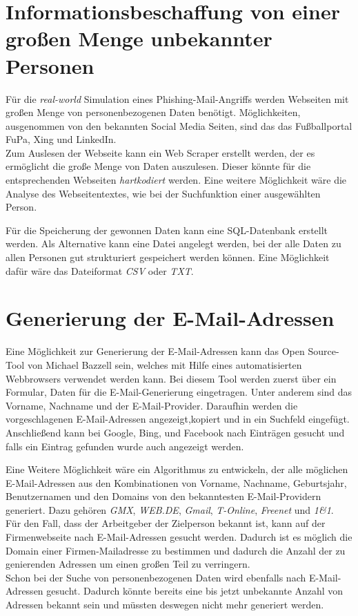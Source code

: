 \section{Informationsbeschaffung von einer großen Menge unbekannter Personen}
Für die \textit{real-world} Simulation eines Phishing-Mail-Angriffs werden Webseiten mit großen Menge von personenbezogenen Daten benötigt. Möglichkeiten, ausgenommen von den bekannten Social Media Seiten, sind das das Fußballportal FuPa, Xing und LinkedIn.\\
Zum Auslesen der Webseite kann ein Web Scraper erstellt werden, der es ermöglicht die große Menge von Daten auszulesen. Dieser könnte für die entsprechenden Webseiten \textit{hartkodiert} werden. Eine weitere Möglichkeit wäre die Analyse des Webseitentextes, wie bei der Suchfunktion einer ausgewählten Person.

Für die Speicherung der gewonnen Daten kann eine SQL-Datenbank erstellt werden.
Als Alternative kann eine Datei angelegt werden, bei der alle Daten zu allen Personen gut strukturiert gespeichert werden können. Eine Möglichkeit dafür wäre das Dateiformat \textit{CSV} oder \textit{TXT}.

\section{Generierung der E-Mail-Adressen}
Eine Möglichkeit zur Generierung der E-Mail-Adressen kann das Open Source-Tool von Michael Bazzell \cite{EmailAssumptions} sein, welches mit Hilfe eines automatisierten Webbrowsers verwendet werden kann. Bei diesem Tool werden zuerst über ein Formular, Daten für die E-Mail-Generierung eingetragen. Unter anderem sind das Vorname, Nachname und der E-Mail-Provider. Daraufhin werden die vorgeschlagenen E-Mail-Adressen angezeigt,kopiert und in ein Suchfeld eingefügt. Anschließend kann bei Google, Bing, und Facebook nach Einträgen gesucht und falls ein Eintrag gefunden wurde auch angezeigt werden.

Eine Weitere Möglichkeit wäre ein Algorithmus zu entwickeln, der alle möglichen E-Mail-Adressen aus den Kombinationen von Vorname, Nachname, Geburtsjahr, Benutzernamen und den Domains von den bekanntesten E-Mail-Providern generiert. Dazu gehören \textit{GMX}, \textit{WEB.DE}, \textit{Gmail}, \textit{T-Online}, \textit{Freenet} und \textit{1\&1}.\cite{AnbieterMail} \\
Für den Fall, dass der Arbeitgeber der Zielperson bekannt ist, kann auf der Firmenwebseite nach E-Mail-Adressen gesucht werden. Dadurch ist es möglich die Domain einer Firmen-Mailadresse zu bestimmen und dadurch die Anzahl der zu genierenden Adressen um einen großen Teil zu verringern.\\
Schon bei der Suche von personenbezogenen Daten wird ebenfalls nach E-Mail-Adressen gesucht. Dadurch könnte bereits eine bis jetzt unbekannte Anzahl von Adressen bekannt sein und müssten deswegen nicht mehr generiert werden.

